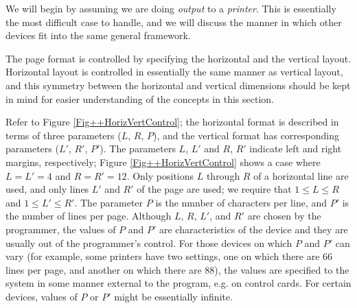 \documentclass[a4paper,11pt]{article}
\begin{document}
We will begin by assuming we are doing {\it output} to a {\it
printer}.  This is essentially the most difficult case to handle, and
we will discuss the manner in which other devices fit into the same
general framework.

The page format is controlled by specifying the horizontal and the
vertical layout.  Horizontal layout is controlled in essentially the
same manner as vertical layout, and this symmetry between the
horizontal and vertical dimensions should be kept in mind for easier
understanding of the concepts in this section.

Refer to Figure \ref{Fig++HorizVertControl}; the horizontal format is
described in terms of three parameters ($L$, $R$, $P$), and the
vertical format has corresponding parameters ($L'$, $R'$, $P'$). The
parameters $L$, $L'$ and $R$, $R'$ indicate left and right margins,
respectively; Figure \ref{Fig++HorizVertControl} shows a case where $L
= L' = 4$ and $R = R' = 12$. Only positions $L$ through $R$ of a
horizontal line are used, and only lines $L'$ and $R'$ of the page are
used; we require that $1 \leq L \leq R$ and $1 \leq L' \leq R'$.  The
parameter $P$ is the nmnber of characters per line, and $P'$ is the
number of lines per page.  Although $L$, $R$, $L'$, and $R'$ are
chosen by the programmer, the values of $P$ and $P'$ are
characteristics of the device and they are usually out of the
programmer's control.  For those devices on which $P$ and $P'$ can
vary (for example, some printers have two settings, one on which there
are 66 lines per page, and another on which there are 88), the values
are specified to the system in some manner external to the \Algol
program, e.g. on control cards.  For certain devices, values of $P$ or
$P'$ might be essentially infinite.
\end{document}
